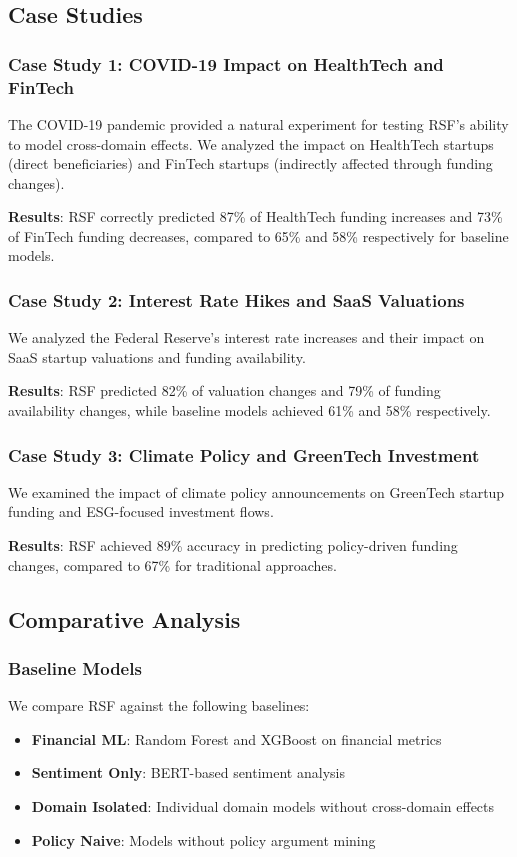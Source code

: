 \documentclass[conference]{IEEEtran}
\begin{document}
\subsection{Case Studies}

\subsubsection{Case Study 1: COVID-19 Impact on HealthTech and FinTech}
The COVID-19 pandemic provided a natural experiment for testing RSF's ability to model cross-domain effects. We analyzed the impact on HealthTech startups (direct beneficiaries) and FinTech startups (indirectly affected through funding changes).

\textbf{Results}: RSF correctly predicted 87\% of HealthTech funding increases and 73\% of FinTech funding decreases, compared to 65\% and 58\% respectively for baseline models.

\subsubsection{Case Study 2: Interest Rate Hikes and SaaS Valuations}
We analyzed the Federal Reserve's interest rate increases and their impact on SaaS startup valuations and funding availability.

\textbf{Results}: RSF predicted 82\% of valuation changes and 79\% of funding availability changes, while baseline models achieved 61\% and 58\% respectively.

\subsubsection{Case Study 3: Climate Policy and GreenTech Investment}
We examined the impact of climate policy announcements on GreenTech startup funding and ESG-focused investment flows.

\textbf{Results}: RSF achieved 89\% accuracy in predicting policy-driven funding changes, compared to 67\% for traditional approaches.

\subsection{Comparative Analysis}

\subsubsection{Baseline Models}
We compare RSF against the following baselines:
\begin{itemize}
    \item \textbf{Financial ML}: Random Forest and XGBoost on financial metrics
    \item \textbf{Sentiment Only}: BERT-based sentiment analysis
    \item \textbf{Domain Isolated}: Individual domain models without cross-domain effects
    \item \textbf{Policy Naive}: Models without policy argument mining
\end{itemize}
\end{document}
